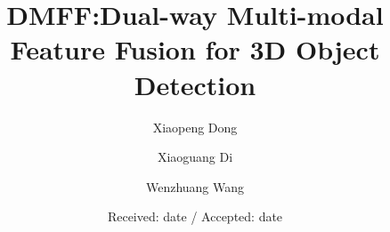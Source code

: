 \usepackage{amsmath,amssymb,amsfonts}    %
\usepackage{multirow}%
\makeatletter
\renewcommand\normalsize{%
 \@setfontsize\normalsize\@xpt\@xiipt
 \abovedisplayskip 7\p@ \@plus1\p@ \@minus6\p@
 \abovedisplayshortskip \z@ \@plus3\p@
 \belowdisplayshortskip 8\p@ \@plus3\p@ \@minus3\p@
 \belowdisplayskip \abovedisplayskip
 \let\@listi\@listI}
\makeatother


%
%
%
%
%

\begin{sloppypar}
\title{DMFF:Dual-way Multi-modal Feature Fusion for 3D Object Detection%
}


\author{Xiaopeng Dong         \and
        Xiaoguang Di         \and
        Wenzhuang Wang
}



\date{Received: date / Accepted: date}


\maketitle


\end{sloppypar}
